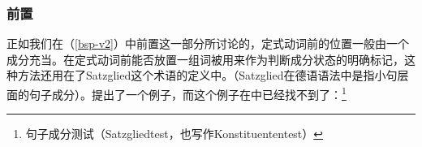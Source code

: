 \subsubsection{前置}
\label{sec-konst-test-probleme-voranstellung} 
正如我们在（\ref{bsp-v2}）中前置这一部分所讨论的，定式动词前的位置一般由一个成分充当。在定式动词前能否放置一组词被用来作为判断成分状态的明确标记，这种方法还用在了Satzglied这个术语的定义中。（Satzglied在德语语法中是指小句层面的句子成分）\citep[]{Duden2005-Authors}。提出了一个例子，而这个例子在中已经找不到了：\footnote{句子成分测试（Satzgliedtest，也写作Konstituententest）}
